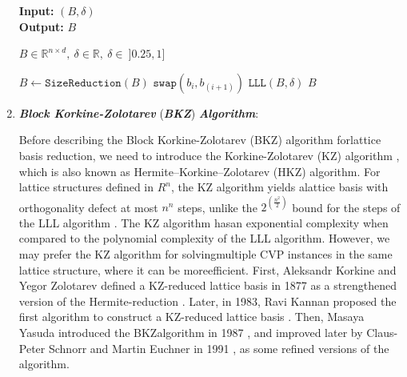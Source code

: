 \documentclass[runningheads]{llncs}
\numberwithin{equation}{section}
\begin{document}
\begin{enumerate}
\begin{algorithm}
            \textbf{Input:} $ (B,\delta) $\\
            \textbf{Output:} $ B $
            
            \begin{algorithmic}[1]
                \Ensure $B \in {\mathbb{R}}^{n \times d},\ \delta \in \mathbb{R},\ \delta \in\ ]0.25, 1]$
            
                \vspace{2ex}

                \State $B \gets \texttt{SizeReduction}(B)$
                        \State $\texttt{swap}({b}_{i},{b}_{(i + 1)})$
                        \State \Return $\texttt{LLL}(B,\delta)$
                    \Else
                        \State \Return $B$
                    \EndIf
                \EndFor
            \end{algorithmic}
        \end{algorithm}
        
        
        \item \textbf{\textit{Block Korkine-Zolotarev}} (\textbf{\textit{BKZ}}) \textbf{\textit{Algorithm}}:
        \vspace{0.6ex}

        Before describing the Block Korkine-Zolotarev (BKZ) algorithm \cite{yasuda:survey-solving-svp-algorithms-recent-strategies-solving-svp-challenge:2021:06-2024} for\break lattice basis reduction, we need to introduce the Korkine-Zolotarev (KZ) algorithm \cite{korkine-zolotarev:sur-les-formes-quadratiques-positives:1877:06-2024}, which is also known as Hermite–Korkine–Zolotarev (HKZ) algorithm. For lattice structures defined in ${R}^{n}$, the KZ algorithm yields a\break lattice basis with orthogonality defect at most ${n}^{n}$ steps, unlike the ${2}^{\left(\frac{{n}^{2}}{2}\right)}$ bound for the steps of the LLL algorithm \cite{lenstra-lenstra-lovasz:factoring-polynomials-with-rational-coefficients:1982:06-2024}. The KZ algorithm \cite{korkine-zolotarev:sur-les-formes-quadratiques-positives:1877:06-2024} has\break an exponential complexity when compared to the polynomial complexity of the LLL algorithm. However, we may prefer the KZ algorithm for solving\break multiple CVP instances in the same lattice structure, where it can be more\break efficient. First, Aleksandr Korkine and Yegor Zolotarev defined a KZ-reduced lattice basis in 1877 as a strengthened version of the Hermite-reduction \cite{korkine-zolotarev:sur-les-formes-quadratiques-positives:1877:06-2024}. Later, in 1983, Ravi Kannan proposed the first algorithm to construct a KZ-reduced lattice basis \cite{kannan:improved-algorithms-integer-programming-related-lattice-problems:1983:06-2024}. Then, Masaya Yasuda introduced the BKZ\break algorithm in 1987 \cite{yasuda:survey-solving-svp-algorithms-recent-strategies-solving-svp-challenge:2021:06-2024}, and improved later by Claus-Peter Schnorr and Martin Euchner in 1991 \cite{schnorr-euchner:lattice-basis-reduction-improved-practical-algorithms-and-solving-subset-sum-problems:1994:06-2024}, as some refined versions of the algorithm.


\end{enumerate}
\end{document}
